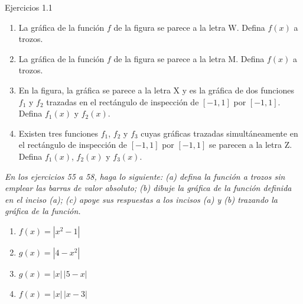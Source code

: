 \documentclass[aspectratio=169,10pt]{beamer}
\begin{document}
\begin{frame}{Ejercicios 1.1}
\begin{enumerate}
\item La gráfica de la función $f$ de la figura se parece a la letra W. Defina $f(x)$ a trozos.
\item La gráfica de la función $f$ de la figura se parece a la letra M. Defina $f(x)$ a trozos.
\item En la figura, la gráfica se parece a la letra X y es la gráfica de dos funciones $f_1$ y $f_2$ trazadas en el rectángulo de inspección de $[-1,1]$ por $[-1,1]$. Defina $f_1(x)$ y $f_2(x)$.
\item Existen tres funciones $f_1$, $f_2$ y $f_3$ cuyas gráficas trazadas simultáneamente en el rectángulo de inspección de $[-1,1]$ por $[-1,1]$ se parecen a la letra Z. Defina $f_1(x)$, $f_2(x)$ y $f_3(x)$.
\end{enumerate}

\textit{En los ejercicios 55 a 58, haga lo siguiente: (a) defina la función a trozos sin emplear las barras de valor absoluto; (b) dibuje la gráfica de la función definida en el inciso (a); (c) apoye sus respuestas a los incisos (a) y (b) trazando la gráfica de la función.}

\begin{enumerate}
\item $f(x)=|x^2-1|$
\item $g(x)=|4-x^2|$
\item $g(x)=|x|\,|5-x|$
\item $f(x)=|x|\,|x-3|$
\end{enumerate}

\newpage
\end{frame}
\end{document}
